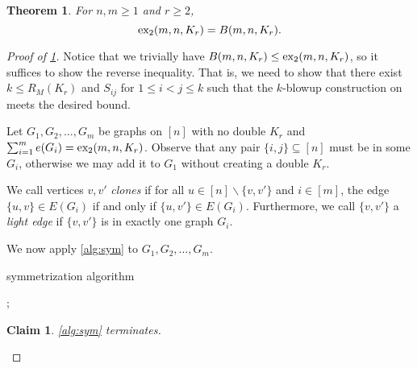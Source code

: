 \documentclass[10pt, reqno]{report}
\newtheorem{theorem}{Theorem}[chapter]
\newtheorem{claim}{Claim}[theorem]
\newcommand*{\dex}{\textnormal{ex}_2}
\begin{document}
\begin{theorem}\label{thm:complete-blowup}
  For $n, m \geq 1$ and $r \geq 2$, 
  \[
    \dex(m, n, K_r) = B(m, n, K_r).
  \]
\end{theorem}

\begin{proof}[Proof of \cref{thm:complete-blowup}]
  Notice that we trivially have $B(m, n, K_r) \leq \dex(m, n, K_r)$, so it suffices to show the reverse inequality. That is, we need to show that there exist $k \leq R_{M}(K_r)$ and $S_{ij}$ for $1 \leq i < j \leq k$ such that the $k$-blowup construction on meets the desired bound.

  Let $G_1, G_2, \ldots, G_m$ be graphs on $[n]$ with no double $K_r$ and $\sum_{i = 1}^m e(G_i) = \dex(m, n, K_r)$. Observe that any pair $\{i, j\} \subseteq [n]$ must be in some $G_i$, otherwise we may add it to $G_1$ without creating a double $K_r$. 

  We call vertices $v, v'$ \textit{clones} if for all $u \in [n] \backslash \{v, v'\}$ and $i \in [m]$, the edge $\{u, v\} \in E(G_i)$ if and only if $\{u, v'\} \in E(G_i)$. Furthermore, we call $\{v, v'\}$ a \textit{light edge} if $\{v, v'\}$ is in exactly one graph $G_i$.

  We now apply \cref{alg:sym} to $G_1, G_2, \ldots, G_m$. 

  \begin{algorithm}[H]
    \caption{symmetrization algorithm}\label{alg:sym}
    \begin{algorithmic}
      \;
      \;
      \;
      \;
      \;
      ;
      \;
          \;
      \EndIf		
      \EndFor
      \EndWhile
      \EndWhile
    \end{algorithmic}
  \end{algorithm}

  \begin{claim}
    \cref{alg:sym} terminates.
  \end{claim}


\end{proof}
\end{document}
